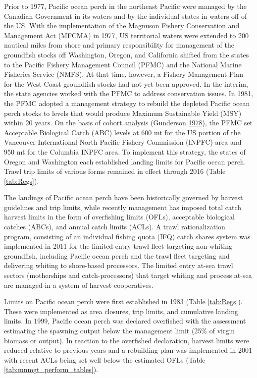 \documentclass[12pt,]{article}
\begin{document}
Prior to 1977, Pacific ocean perch in the northeast Pacific were managed
by the Canadian Government in its waters and by the individual states in
waters off of the US. With the implementation of the Magnuson Fishery
Conservation and Management Act (MFCMA) in 1977, US territorial waters
were extended to 200 nautical miles from shore and primary
responsibility for management of the groundfish stocks off Washington,
Oregon, and California shifted from the states to the Pacific Fishery
Management Council (PFMC) and the National Marine Fisheries Service
(NMFS). At that time, however, a Fishery Management Plan for the West
Coast groundfish stocks had not yet been approved. In the interim, the
state agencies worked with the PFMC to address conservation issues. In
1981, the PFMC adopted a management strategy to rebuild the depleted
Pacific ocean perch stocks to levels that would produce Maximum
Sustainable Yield (MSY) within 20 years. On the basis of cohort analysis
(Gunderson \protect\hyperlink{ref-gunderson_results_1978}{1978}), the
PFMC set Acceptable Biological Catch (ABC) levels at 600 mt for the US
portion of the Vancouver International North Pacific Fishery Commission
(INPFC) area and 950 mt for the Columbia INPFC area. To implement this
strategy, the states of Oregon and Washington each established landing
limits for Pacific ocean perch. Trawl trip limits of various forms
remained in effect through 2016 (Table \ref{tab:Regs}).

The landings of Pacific ocean perch have been historically governed by
harvest guidelines and trip limits, while recently management has
imposed total catch harvest limits in the form of overfishing limits
(OFLs), acceptable biological catches (ABCs), and annual catch limits
(ACLs). A trawl rationalization program, consisting of an individual
fishing quota (IFQ) catch shares system was implemented in 2011 for the
limited entry trawl fleet targeting non-whiting groundfish, including
Pacific ocean perch and the trawl fleet targeting and delivering whiting
to shore-based processors. The limited entry at-sea trawl sectors
(motherships and catch-processors) that target whiting and process
at-sea are managed in a system of harvest cooperatives.

Limits on Pacific ocean perch were first established in 1983 (Table
\ref{tab:Regs}). These were implemented as area closures, trip limits,
and cumulative landing limits. In 1999, Pacific ocean perch was declared
overfished with the assessment estimating the spawning output below the
management limit (25\% of virgin biomass or output). In reaction to the
overfished declaration, harvest limits were reduced relative to previous
years and a rebuilding plan was implemented in 2001 with recent ACLs
being set well below the estimated OFLs (Table
\ref{tab:mnmgt_perform_tables}).
\end{document}

